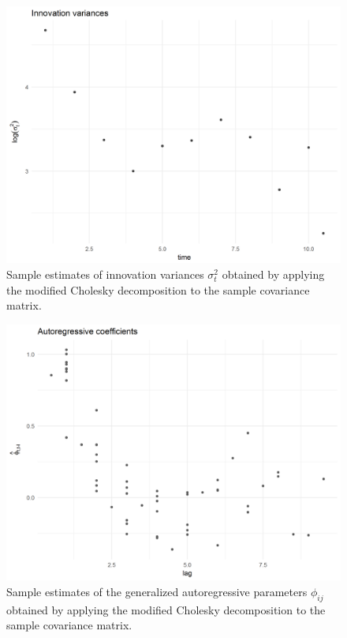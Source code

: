 \documentclass[12pt]{article}
\theoremstyle{definition}
\begin{document}
\begin{figure}[h] \label{fig:cattleA-innovation-variogram}
\begin{center}
    \includegraphics[width=\textwidth]{img/cattle/cattleA-innovation-variogram}
\end{center}
 \caption{Sample estimates of innovation variances $\sigma_t^2$ obtained by applying the modified Cholesky decomposition to the sample covariance matrix.}
 \end{figure}

\begin{figure}[h] \label{fig:cattleA-regressogram}
\begin{center}
\includegraphics[width = \textwidth]{img/cattle/cattleA-regressogram}
\end{center}
 \caption{Sample estimates of the generalized autoregressive parameters $\phi_{ij}$ obtained by applying the modified Cholesky decomposition to the sample covariance matrix.}
\end{figure} 
\end{document}
